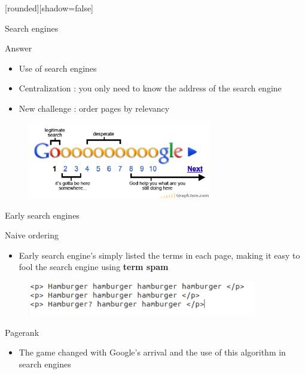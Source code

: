 \documentclass[10pt]{beamer}
\begin{document}
[rounded][shadow=false]
\begin{frame}{Search engines}
  \begin{block}{Answer}
    \begin{itemize}
      \item Use of search engines
      \item Centralization : you only need to know the address of the search engine
      \item New challenge : order pages by relevancy
    \end{itemize}
  \end{block}
  \begin{figure}
    \centering
    \includegraphics[width = 8cm]{google-search-result-pages.png}
  \end{figure}

\end{frame}


\begin{frame}{Early search engines}
  \begin{block}{Naive ordering}
    \begin{itemize}
      \item Early search engine's simply listed the terms in each page, making it easy to fool the search engine using \textbf{term spam}

    \end{itemize}
  \end{block}
  \begin{figure}
    \includegraphics[width = 10cm]{termspam.png}
  \end{figure}
  \begin{block}{Pagerank}
    \begin{itemize}
      \item The game changed with Google's arrival and the use of this algorithm in search engines
    \end{itemize}
  \end{block}
\end{frame}
\end{document}
